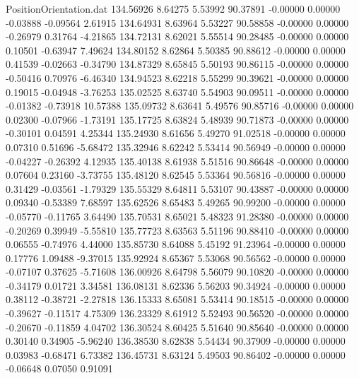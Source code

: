 \begin{filecontents}{PositionOrientation.dat}
 134.56926    8.64275    5.53992    90.37891   -0.00000    0.00000   -0.03888   -0.09564    2.61915
 134.64931    8.63964    5.53227    90.58858   -0.00000    0.00000   -0.26979    0.31764   -4.21865
 134.72131    8.62021    5.55514    90.28485   -0.00000    0.00000    0.10501   -0.63947    7.49624
 134.80152    8.62864    5.50385    90.88612   -0.00000    0.00000    0.41539   -0.02663   -0.34790
 134.87329    8.65845    5.50193    90.86115   -0.00000    0.00000   -0.50416    0.70976   -6.46340
 134.94523    8.62218    5.55299    90.39621   -0.00000    0.00000    0.19015   -0.04948   -3.76253
 135.02525    8.63740    5.54903    90.09511   -0.00000    0.00000   -0.01382   -0.73918   10.57388
 135.09732    8.63641    5.49576    90.85716   -0.00000    0.00000    0.02300   -0.07966   -1.73191
 135.17725    8.63824    5.48939    90.71873   -0.00000    0.00000   -0.30101    0.04591    4.25344
 135.24930    8.61656    5.49270    91.02518   -0.00000    0.00000    0.07310    0.51696   -5.68472
 135.32946    8.62242    5.53414    90.56949   -0.00000    0.00000   -0.04227   -0.26392    4.12935
 135.40138    8.61938    5.51516    90.86648   -0.00000    0.00000    0.07604    0.23160   -3.73755
 135.48120    8.62545    5.53364    90.56816   -0.00000    0.00000    0.31429   -0.03561   -1.79329
 135.55329    8.64811    5.53107    90.43887   -0.00000    0.00000    0.09340   -0.53389    7.68597
 135.62526    8.65483    5.49265    90.99200   -0.00000    0.00000   -0.05770   -0.11765    3.64490
 135.70531    8.65021    5.48323    91.28380   -0.00000    0.00000   -0.20269    0.39949   -5.55810
 135.77723    8.63563    5.51196    90.88410   -0.00000    0.00000    0.06555   -0.74976    4.44000
 135.85730    8.64088    5.45192    91.23964   -0.00000    0.00000    0.17776    1.09488   -9.37015
 135.92924    8.65367    5.53068    90.56562   -0.00000    0.00000   -0.07107    0.37625   -5.71608
 136.00926    8.64798    5.56079    90.10820   -0.00000    0.00000   -0.34179    0.01721    3.34581
 136.08131    8.62336    5.56203    90.34924   -0.00000    0.00000    0.38112   -0.38721   -2.27818
 136.15333    8.65081    5.53414    90.18515   -0.00000    0.00000   -0.39627   -0.11517    4.75309
 136.23329    8.61912    5.52493    90.56520   -0.00000    0.00000   -0.20670   -0.11859    4.04702
 136.30524    8.60425    5.51640    90.85640   -0.00000    0.00000    0.30140    0.34905   -5.96240
 136.38530    8.62838    5.54434    90.37909   -0.00000    0.00000    0.03983   -0.68471    6.73382
 136.45731    8.63124    5.49503    90.86402   -0.00000    0.00000   -0.06648    0.07050    0.91091

\end{filecontents}
